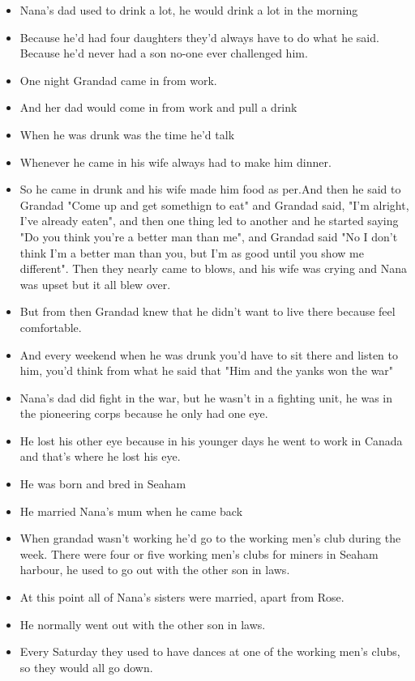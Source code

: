 \documentclass[10pt,twocolumn,letterpaper]{article}
\begin{document}
\begin{itemize}
    \item Nana's dad used to drink a lot, he would drink a lot in the morning
    \item Because he'd had four daughters they'd always have to do what he said. Because he'd never had a son no-one ever challenged him.
    \item One night Grandad came in from work.
    \item And her dad would come in from work and pull a drink
    \item When he was drunk was the time he'd talk
    \item Whenever he came in his wife always had to make him dinner.
    \item So he came in drunk and his wife made him food as per.And then he said to Grandad "Come up and get somethign to eat" and Grandad said, "I'm alright, I've already eaten", and then one thing led to another and he started saying "Do you think you're a better man than me", and Grandad said "No I don't think I'm a better man than you, but I'm as good until you show me different". Then they nearly came to blows, and his wife was crying and Nana was upset but it all blew over.
    \item But from then Grandad knew that he didn't want to live there because feel comfortable.
    \item And every weekend when he was drunk you'd have to sit there and listen to him, you'd think from what he said that "Him and the yanks won the war"
    \item Nana's dad did fight in the war, but he wasn't in a fighting unit, he was in the pioneering corps because he only had one eye.
    \item He lost his other eye because in his younger days he went to work in Canada and that's where he lost his eye.
    \item He was born and bred in Seaham 
    \item He married Nana's mum when he came back
    \item When grandad wasn't working he'd go to the working men's club during the week. There were four or five working men's clubs for miners in Seaham harbour, he used to go out with the other son in laws. 
    \item At this point all of Nana's sisters were married, apart from Rose. 
    \item He normally went out with the other son in laws.
    \item Every Saturday they used to have dances at one of the working men's clubs, so they would all go down.

\end{itemize}
\end{document}
